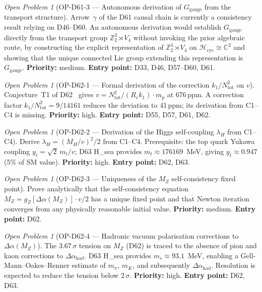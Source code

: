 \documentclass[11pt,a4paper]{article}
\theoremstyle{plain}
\theoremstyle{definition}
\theoremstyle{remark}
\newtheorem{openproblem}[theorem]{Open Problem}
\begin{document}
\begin{openproblem}[OP-D61-3 --- Autonomous derivation of $G_\mathrm{gauge}$ from the transport structure]
\label{op:D61three}
Arrow~$\gamma$ of the D61 causal chain is currently a consistency result relying on D46--D60. An autonomous derivation would establish $G_\mathrm{gauge}$ directly from the transport group $\mathbb{Z}_2^3 \rtimes V_4$ without invoking the prior algebraic route, by constructing the explicit representation of $\mathbb{Z}_2^3 \rtimes V_4$ on $\mathcal{H}_\mathrm{cyc} \cong \mathbb{C}^2$ and showing that the unique connected Lie group extending this representation is $G_\mathrm{gauge}$. \textbf{Priority:} medium. \textbf{Entry point:} D33, D46, D57--D60, D61.
\end{openproblem}

\begin{openproblem}[OP-D62-1 --- Formal derivation of the correction $k_1/N_{\mathrm{tot}}^2$ on $v$]
\label{op:D62one}
Conjecture~T1 of D62~\cite{D62} gives $v = N_{\mathrm{tot}}^2/(R_e k_1)\cdot m_p$ at 676\,ppm. A correction factor $k_1/N_{\mathrm{tot}}^2 = 9/14161$ reduces the deviation to 41\,ppm; its derivation from C1--C4 is missing. \textbf{Priority:} high. \textbf{Entry point:} D55, D57, D61, D62.
\end{openproblem}

\begin{openproblem}[OP-D62-2 --- Derivation of the Higgs self-coupling $\lambda_H$ from C1--C4]
\label{op:D62two}
Derive $\lambda_H = (M_H/v)^2/2$ from C1--C4. Prerequisite: the top quark Yukawa coupling $y_t = \sqrt{2}\,m_t/v$; D63 H\_sea provides $m_t \approx 176169$~MeV, giving $y_t \approx 0.947$ (5\% of SM value). \textbf{Priority:} high. \textbf{Entry point:} D62, D63.
\end{openproblem}

\begin{openproblem}[OP-D62-3 --- Uniqueness of the $M_Z$ self-consistency fixed point]
\label{op:D62three}
Prove analytically that the self-consistency equation $M_Z = g_Z[\Delta\alpha(M_Z)]\cdot v/2$ has a unique fixed point and that Newton iteration converges from any physically reasonable initial value. \textbf{Priority:} medium. \textbf{Entry point:} D62.
\end{openproblem}

\begin{openproblem}[OP-D62-4 --- Hadronic vacuum polarisation corrections to $\Delta\alpha(M_Z)$]
\label{op:D62four}
The $3.67\,\sigma$ tension on $M_Z$ (D62) is traced to the absence of pion and kaon corrections to $\Delta\alpha_{\mathrm{had}}$. D63 H\_sea provides $m_s \approx 93.1$~MeV, enabling a Gell-Mann--Oakes--Renner estimate of $m_\pi$, $m_K$, and subsequently $\Delta\alpha_{\mathrm{had}}$. Resolution is expected to reduce the tension below $2\,\sigma$. \textbf{Priority:} high. \textbf{Entry point:} D62, D63.
\end{openproblem}
\end{document}
